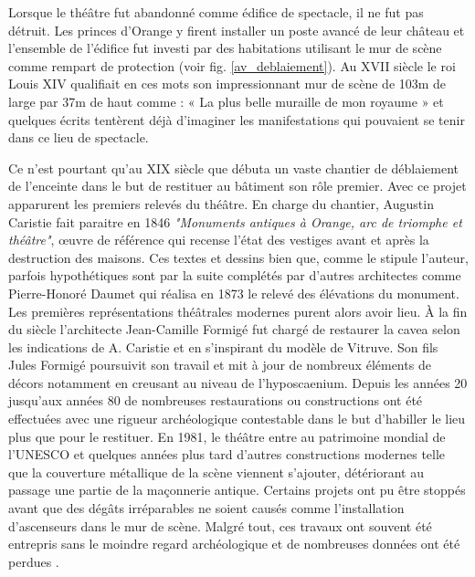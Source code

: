			 Lorsque le théâtre fut abandonné comme édifice de spectacle, il ne fut pas détruit. Les princes d'Orange y firent installer un poste avancé de leur château et l’ensemble de l’édifice fut investi par des habitations utilisant le mur de scène comme rempart de protection (voir fig. \ref{av_deblaiement}). Au XVII siècle le roi Louis XIV qualifiait en ces mots son impressionnant mur de scène de 103m de large par 37m de haut comme : « La plus belle muraille de mon royaume » \cite[]{siteTheatre} et quelques écrits tentèrent déjà d'imaginer les manifestations qui pouvaient se tenir dans ce lieu de spectacle. 
			 
			 Ce n'est pourtant qu'au XIX siècle que débuta un vaste chantier de déblaiement de l'enceinte dans le but de restituer au bâtiment son rôle premier. Avec ce projet apparurent les premiers relevés du théâtre. En charge du chantier, Augustin Caristie fait paraitre en 1846 \textit{"Monuments antiques à Orange, arc de triomphe et théâtre"}, \oe{}uvre de référence qui recense l'état des vestiges avant et après la destruction des maisons. Ces textes et dessins bien que, comme le stipule l'auteur, parfois hypothétiques sont par la suite complétés par d'autres architectes comme Pierre-Honoré Daumet qui réalisa en 1873 le relevé des élévations du monument. Les premières représentations théâtrales modernes purent alors avoir lieu. À la fin du siècle l'architecte Jean-Camille Formigé fut chargé de restaurer la \gls{cavea} selon les indications de A. Caristie et en s'inspirant du modèle de Vitruve. Son fils Jules Formigé poursuivit son travail et mit à jour de nombreux éléments de décors notamment en creusant au niveau de l'\gls{hyposcaenium}. Depuis les années 20 jusqu'aux années 80 de nombreuses restaurations ou constructions ont été effectuées avec une rigueur archéologique contestable dans le but d'habiller le lieu plus que pour le restituer. En 1981, le théâtre entre au patrimoine mondial de l'UNESCO et quelques années plus tard d'autres constructions modernes telle que la couverture métallique de la scène viennent s'ajouter, détériorant au passage une partie de la maçonnerie antique. Certains projets ont pu être stoppés avant que des dégâts irréparables ne soient causés comme l'installation d'ascenseurs dans le mur de scène. Malgré tout, ces travaux ont souvent été entrepris sans le moindre regard archéologique et de nombreuses données ont été perdues \cite[p 231- 236]{carteArcheo}.

